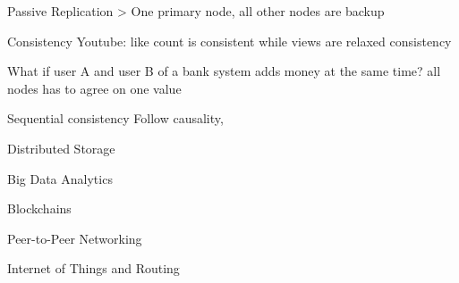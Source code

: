 \documentclass[aspectratio=1610,17pt,utf8]{beamer}
\begin{document}
\begin{frame}{Passive Replication}
    > One primary node, all other nodes are backup
\end{frame}

\begin{frame}{Consistency}
    Youtube: like count is consistent while views are relaxed consistency

    What if user A and user B of a bank system adds money at the same time? all nodes has to agree on one value

\end{frame}

\begin{frame}{Sequential consistency}
    Follow causality, 
\end{frame}


\begin{frame}{Distributed Storage}
\end{frame}


\begin{frame}{Big Data Analytics}
\end{frame}


\begin{frame}{Blockchains}
\end{frame}


\begin{frame}{Peer-to-Peer Networking}
\end{frame}


\begin{frame}{Internet of Things and Routing}
\end{frame}
\end{document}
